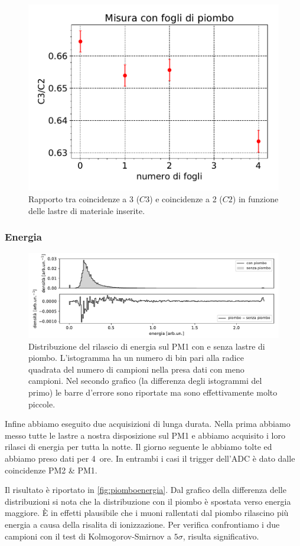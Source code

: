 \begin{figure}
\centering
\includegraphics[width=8 cm]{confronto}
\caption{Rapporto tra coincidenze a 3 ($C3$) e coincidenze a 2 ($C2$) in funzione delle lastre di materiale inserite.}
\label{cfr}
\end{figure}

\subsubsection{Energia}

\begin{figure}
	\hspace{-7.5em}
	\includegraphics[width=1.4\textwidth]{piombo_energia}
	\caption{\label{fig:piomboenergia}
	Distribuzione del rilascio di energia sul PM1 con e senza lastre di piombo.
	L'istogramma ha un numero di bin pari alla radice quadrata del numero di campioni nella presa dati con meno campioni.
	Nel secondo grafico (la differenza degli istogrammi del primo)
	le barre d'errore sono riportate ma sono effettivamente molto piccole.}
\end{figure}

Infine abbiamo eseguito due acquisizioni di lunga durata.
Nella prima abbiamo messo tutte le lastre a nostra disposizione sul PM1
e abbiamo acquisito i loro rilasci di energia per tutta la notte.
Il giorno seguente le abbiamo tolte ed abbiamo preso dati per \SI{4}{ore}.
In entrambi i casi il trigger dell'ADC è dato dalle coincidenze PM2 \& PM1.

Il risultato è riportato in \autoref{fig:piomboenergia}.
Dal grafico della differenza delle distribuzioni
si nota che la distribuzione con il piombo è spostata verso energia maggiore.
È in effetti plausibile che i muoni rallentati dal piombo
rilascino più energia a causa della risalita di ionizzazione.
Per verifica confrontiamo i due campioni con il test di Kolmogorov-Smirnov a $5\sigma$,
risulta significativo.
